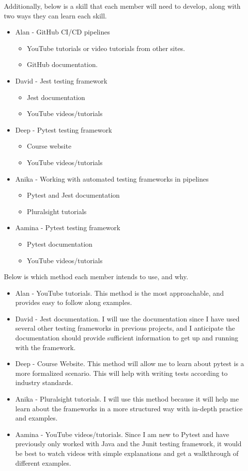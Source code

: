 \documentclass[12pt, titlepage]{article}
\begin{document}
Additionally, below is a skill that each member will need to develop, along with two ways they can learn each skill.
\begin{itemize}
\item Alan - GitHub CI/CD pipelines
\begin{itemize}
\item YouTube tutorials or video tutorials from other sites.
\item GitHub documentation.
\end{itemize}
\item David - Jest testing framework
\begin{itemize}
  \item Jest documentation
  \item YouTube videos/tutorials 
\end{itemize}
\item Deep - Pytest testing framework
\begin{itemize}
  \item Course website
  \item YouTube videos/tutorials 
\end{itemize}
\item Anika - Working with automated testing frameworks in pipelines
  \begin {itemize}
    \item Pytest and Jest documentation
    \item Pluralsight tutorials
  \end {itemize}
\item Aamina - Pytest testing framework
  \begin {itemize}
    \item Pytest documentation
    \item YouTube videos/tutorials
  \end {itemize}
\end{itemize}

Below is which method each member intends to use, and why.
\begin{itemize}
\item Alan - YouTube tutorials. This method is the most approachable, and provides easy to follow along examples.
\item David - Jest documentation. I will use the documentation since I have used several other testing frameworks in previous projects, and I anticipate the documentation should provide sufficient information to get up and running with the framework.
\item Deep - Course Website. This method will allow me to learn about pytest is a more formalized scenario. This will help with writing tests according to industry standards.
\item Anika - Pluralsight tutorials. I will use this method because it will help me learn about the frameworks in a more structured way with in-depth practice and examples.
\item Aamina - YouTube videos/tutorials. Since I am new to Pytest and have previously only worked with Java and the Junit testing framework, it would be best to watch videos with simple explanations and get a walkthrough of different examples.
\end{itemize}
\end{document}
